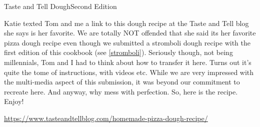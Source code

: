 \begin{entry}{Taste and Tell Dough}{Second Edition}

\begin{open}
 Katie texted Tom and me a link to this dough recipe at the Taste and Tell blog she says is her favorite. We are totally NOT offended that she said its her favorite pizza dough recipe even though we submitted a stromboli dough recipe with the first edition of this cookbook (see \ref{stromboli}). Seriously though, not being millennials, Tom and I had to think about how to transfer it here. Turns out it's quite the tome of instructions, with videos etc. While we are very impressed with the multi-media aspect of this submission, it was beyond our commitment to recreate here. And anyway, why mess with perfection. So, here is the recipe. Enjoy!
 \\
 

\end{open}
 \url{https://www.tasteandtellblog.com/homemade-pizza-dough-recipe/}
\end{entry}


